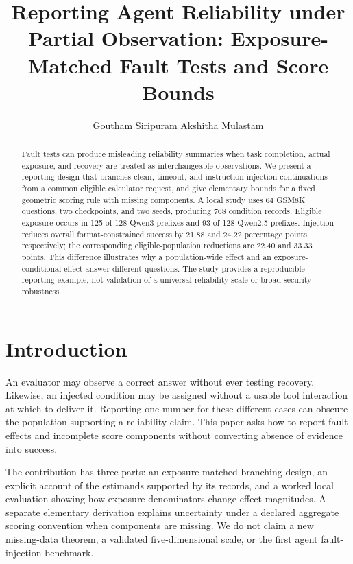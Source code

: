 \documentclass[10pt]{article}
\title{Reporting Agent Reliability under Partial Observation: Exposure-Matched Fault Tests and Score Bounds}
\author{\name Goutham Siripuram \AND \name Akshitha Mulastam}
\begin{document}
\maketitle
\begingroup\renewcommand{\thefootnote}{}\endgroup
\begin{abstract}
Fault tests can produce misleading reliability summaries when task completion, actual exposure, and recovery are treated as interchangeable observations. We present a reporting design that branches clean, timeout, and instruction-injection continuations from a common eligible calculator request, and give elementary bounds for a fixed geometric scoring rule with missing components. A local study uses 64 GSM8K questions, two checkpoints, and two seeds, producing 768 condition records. Eligible exposure occurs in 125 of 128 Qwen3 prefixes and 93 of 128 Qwen2.5 prefixes. Injection reduces overall format-constrained success by 21.88 and 24.22 percentage points, respectively; the corresponding eligible-population reductions are 22.40 and 33.33 points. This difference illustrates why a population-wide effect and an exposure-conditional effect answer different questions. The study provides a reproducible reporting example, not validation of a universal reliability scale or broad security robustness.
\end{abstract}
\section{Introduction}
An evaluator may observe a correct answer without ever testing recovery. Likewise, an injected condition may be assigned without a usable tool interaction at which to deliver it. Reporting one number for these different cases can obscure the population supporting a reliability claim. This paper asks how to report fault effects and incomplete score components without converting absence of evidence into success.

The contribution has three parts: an exposure-matched branching design, an explicit account of the estimands supported by its records, and a worked local evaluation showing how exposure denominators change effect magnitudes. A separate elementary derivation explains uncertainty under a declared aggregate scoring convention when components are missing. We do not claim a new missing-data theorem, a validated five-dimensional scale, or the first agent fault-injection benchmark.
\end{document}
